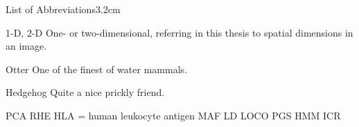 \begin{mclistof}{List of Abbreviations}{3.2cm}

\item[1-D, 2-D] One- or two-dimensional, referring in this thesis to spatial dimensions in an image.

\item[Otter] One of the finest of water mammals.

\item[Hedgehog] Quite a nice prickly friend.

PCA
RHE
HLA =  human leukocyte antigen
MAF
LD
LOCO
PGS
HMM
ICR

\end{mclistof} 
